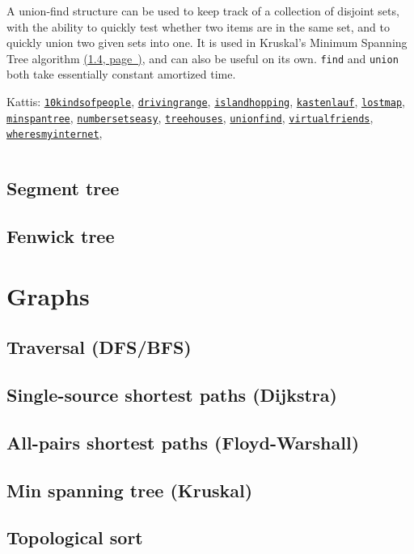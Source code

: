\documentclass[10pt]{article}
\newcommand{\code}[1]{\inputminted[fontsize=\normalsize]{java}{code/#1}}
\newcommand*{\link}[1]{\hyperref[{#1}]{(\ref*{#1}, page~\pageref*{#1})}}
\newcommand{\kattis}[1]{\href{https://open.kattis.com/problems/#1}{\texttt{#1}}}
\begin{document}
A union-find structure can be used to keep track of a collection of
disjoint sets, with the ability to quickly test whether two items are
in the same set, and to quickly union two given sets into one.  It is
used in Kruskal's Minimum Spanning Tree algorithm \link{sec:kruskal},
and can also be useful on its own.  \texttt{find} and \texttt{union}
both take essentially constant amortized time.

Kattis: \kattis{10kindsofpeople}, \kattis{drivingrange},
\kattis{islandhopping}, \kattis{kastenlauf}, \kattis{lostmap},
\kattis{minspantree}, \kattis{numbersetseasy}, \kattis{treehouses},
\kattis{unionfind}, \kattis{virtualfriends},
\kattis{wheresmyinternet},

\code{data-structures/UnionFind.java}

\subsection{Segment tree}

\subsection{Fenwick tree}


\section{Graphs}

\subsection{Traversal (DFS/BFS)}

\subsection{Single-source shortest paths (Dijkstra)}

\subsection{All-pairs shortest paths (Floyd-Warshall)}

\subsection{Min spanning tree (Kruskal)} \label{sec:kruskal}

\subsection{Topological sort}
\end{document}
